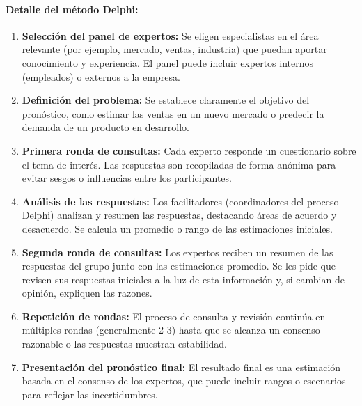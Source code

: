


\paragraph{Detalle del método Delphi:}

\begin{enumerate}
    \item \textbf{Selección del panel de expertos:} Se eligen especialistas en el área relevante (por ejemplo, mercado, ventas, industria) que puedan aportar conocimiento y experiencia. El panel puede incluir expertos internos (empleados) o externos a la empresa.
    
    \item \textbf{Definición del problema:} Se establece claramente el objetivo del pronóstico, como estimar las ventas en un nuevo mercado o predecir la demanda de un producto en desarrollo.
    
    \item \textbf{Primera ronda de consultas:} Cada experto responde un cuestionario sobre el tema de interés. Las respuestas son recopiladas de forma anónima para evitar sesgos o influencias entre los participantes.
    
    \item \textbf{Análisis de las respuestas:} Los facilitadores (coordinadores del proceso Delphi) analizan y resumen las respuestas, destacando áreas de acuerdo y desacuerdo. Se calcula un promedio o rango de las estimaciones iniciales.
    
    \item \textbf{Segunda ronda de consultas:} Los expertos reciben un resumen de las respuestas del grupo junto con las estimaciones promedio. Se les pide que revisen sus respuestas iniciales a la luz de esta información y, si cambian de opinión, expliquen las razones.
    
    \item \textbf{Repetición de rondas:} El proceso de consulta y revisión continúa en múltiples rondas (generalmente 2-3) hasta que se alcanza un consenso razonable o las respuestas muestran estabilidad.
    
    \item \textbf{Presentación del pronóstico final:} El resultado final es una estimación basada en el consenso de los expertos, que puede incluir rangos o escenarios para reflejar las incertidumbres.
\end{enumerate}

